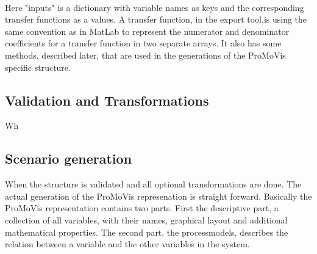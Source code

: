 \setlength\fboxsep{0pt}
\setlength\fboxrule{0.5pt}
\\\newline Here "inputs" is a dictionary with variable names as keys and the corresponding transfer functions as a values. A transfer function, in the export tool,is using the same convention as in MatLab to represent the numerator and denominator coefficients for a transfer function in two separate arrays. It also has some methods, described later, that are used in the generations of the ProMoVis specific structure. 


\subsection{Validation and Transformations}
Wh
\subsection{Scenario generation}
When the structure is validated and all optional transformations are done. The actual generation of the ProMoVis represenation is straight forward. Basically the ProMoVis representation contains two parts. First the descriptive part, a collection of all variables, with their names, graphical layout and additional mathematical properties. The second part,  the processmodels, describes the relation between a variable and the other variables in the system. 
